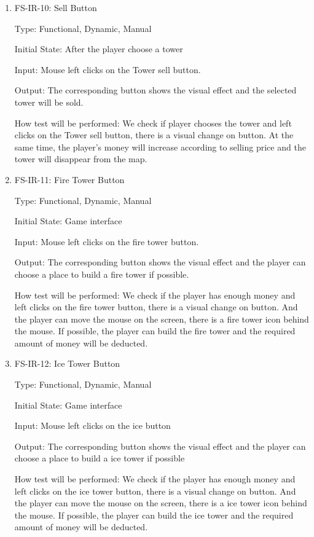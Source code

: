 \documentclass[12pt]{article}
\begin{document}
\begin{enumerate}
	\item{FS-IR-10: Sell Button}
					
	Type: Functional, Dynamic, Manual
					
	Initial State: After the player choose a tower
					
	Input: Mouse left clicks on the Tower sell button.
					
	Output: The corresponding button shows the visual effect and the selected tower will be sold.
					
	How test will be performed: We check if player chooses the tower and left clicks on the Tower sell button, there is a visual change on button. At the same time, the player's money will increase according to selling price and the tower will disappear from the map.
	
	\item{FS-IR-11: Fire Tower Button}
					
	Type: Functional, Dynamic, Manual
					
	Initial State: Game interface
					
	Input: Mouse left clicks on the fire tower button.
					
	Output: The corresponding button shows the visual effect and the player can choose a place to build a fire tower if possible.
					
	How test will be performed: We check if the player has enough money and left clicks on the fire tower button, there is a visual change on button. And the player can move the mouse on the screen, there is a fire tower icon behind the mouse. If possible, the player can build the fire tower and the required amount of money will be deducted.
	
	\item{FS-IR-12: Ice Tower Button}
					
	Type: Functional, Dynamic, Manual
					
	Initial State: Game interface
					
	Input: Mouse left clicks on the ice button
					
	Output: The corresponding button shows the visual effect and the player can choose a place to build a ice tower if possible
					
	How test will be performed: We check if the player has enough money and left clicks on the ice tower button, there is a visual change on button. And the player can move the mouse on the screen, there is a ice tower icon behind the mouse. If possible, the player can build the ice tower and the required amount of money will be deducted.
	

\end{enumerate}
\end{document}
